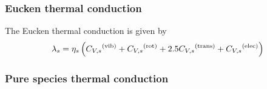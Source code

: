 \subsubsection{Eucken thermal conduction}

The Eucken thermal conduction is given by
\begin{equation}
\thermcond[s] = \vis[s]\left(\foreach \pre/\mod in {/vib,+/rot,+2.5/trans,+/elec} 
                {
                    \pre\specificHeat[\Vol,s]^{(\text{\mod})}
                }
                \right)
\label{thermal_cond:eucken:eq}
\end{equation}

\subsubsection{Pure species thermal conduction}


